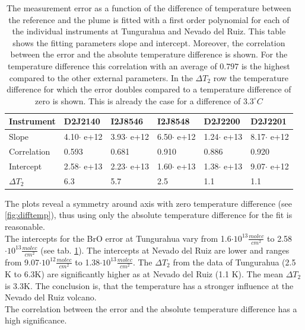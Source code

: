\begin{table}[h]
	\centering
	\begin{tabular}{|p{2cm}|p{2cm}|p{2cm}|p{2cm}|p{2cm}|p{2cm}|}
		Instrument	&D2J2140&I2J8546& I2J8548&D2J2200&D2J2201\\
		\toprule
		Slope&4.10$\cdot$ e+12 &3.93$\cdot$ e+12 &6.50$\cdot$ e+12 &1.24$\cdot$ e+13&8.17$\cdot$ e+12 \\
		\midrule
		Correlation
		& 
		0.593& 
		0.681& 
		0.910& 
		0.886& 
		0.920\\
		\midrule
		Intercept&2.58$\cdot$ e+13&2.23$\cdot$ e+13&1.60$\cdot$ e+13& 1.38$\cdot$ e+13& 9.07$\cdot$ e+12\\
		\midrule
		$\Delta T_{2}$&6.3&5.7&2.5&1.1&1.1\\
		\bottomrule
	\end{tabular}
	\label{tab:tempe}
	\caption{The  measurement error as a function of the difference of temperature between the reference and the plume is fitted with a first order polynomial for each of the individual instruments at Tungurahua and Nevado del Ruiz. This table shows the fitting parameters slope and intercept. Moreover, the correlation between the  error and the absolute temperature difference is shown. For the temperature difference this correlation with an average of $0.797$ is the highest compared to the other external parameters. In the $\Delta T_{2}$ row the temperature difference for which the error doubles compared to a temperature difference of zero is shown. This is already the case for a difference of $3.3^\circ C$}
\end{table}
The plots reveal a symmetry around axis with zero temperature difference (see \cref{fig:difftemp}), thus using only the absolute temperature difference for the fit is reasonable.\\
The intercepts for the BrO error at Tungurahua vary from 1.6$\cdot10^{13}\frac{molec}{cm^2}$ to 2.58$\cdot10^{13}\frac{molec}{cm^2}$ (see tab. \ref{tab:tempe}). The intercepts at Nevado del Ruiz are lower and ranges from  9.07$\cdot10^{12}\frac{molec}{cm^2}$ to 1.38$\cdot10^{13}\frac{molec}{cm^2}$. The $\Delta T_{2}$ from the data of Tungurahua (2.5 K to 6.3K) are significantly higher as at Nevado del Ruiz (1.1 K). The mean $\Delta T_{2}$ is $ 3.3$K. The conclusion is, that the temperature has a stronger influence at the Nevado del Ruiz volcano.\\
The correlation between the  error and the absolute temperature difference has a high significance. 
